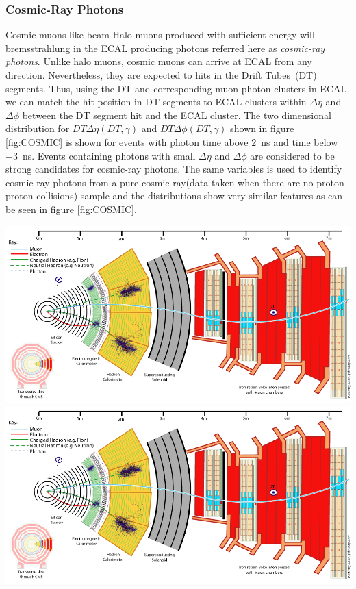 \subsubsection{Cosmic-Ray Photons}
Cosmic muons like beam Halo muons produced with sufficient energy  will bremsstrahlung in the ECAL producing photons referred here as \textit{cosmic-ray photons}. Unlike halo muons, cosmic muons can arrive at ECAL from any direction. Nevertheless, they are expected to hits in the Drift Tubes~(DT) segments. Thus, using the DT and corresponding  muon photon clusters in ECAL we can match the  hit position in DT segments to ECAL clusters within $\Delta\eta$ and $\Delta\phi$ between the DT segment hit and the ECAL cluster. The two dimensional distribution for $DT\Delta\eta(DT,\gamma)$ and $DT\Delta\phi(DT,\gamma)$ shown in figure \ref{fig:COSMIC} is shown for events with photon time above $2$~ns and time below $-3$~ns. Events containing photons with small $\Delta\eta$ and $\Delta\phi$ are considered to be strong candidates for cosmic-ray photons. The same variables is used to identify cosmic-ray photons from a pure cosmic ray(data taken when there are no proton-proton collisions) sample and the distributions show very similar features as can be seen in figure 
\ref{fig:COSMIC}.

\begin{center}
\centering
\includegraphics[scale=0.2]{THESISPLOTS/CMS_Slice.png}
\includegraphics[scale=0.2]{THESISPLOTS/CMS_Slice.png}
\label{fig:COSMIC}
\end{center}

